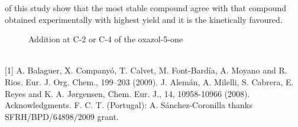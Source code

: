 of this study show that the most stable compound agree with that compound obtained
experimentally with highest yield and it is the kinetically favoured.
\\
\renewcommand{\figurename}{Scheme}
\begin{figure}[h]
 \centerline{}
 \caption[]{Addition at C-2 or C-4 of the oxazol-5-one}
\end{figure}
\renewcommand{\figurename}{Figure}
\\
{\footnotesize
[1] A. Balaguer, X. Companyó, T. Calvet, M. Font-Bardía, A. Moyano and R. Rios. Eur. J. Org.
Chem., 199–203 (2009).
\newline
[2] J. Alemán, A. Milelli, S. Cabrera, E. Reyes and K. A. Jørgensen, Chem. Eur. J., 14, 10958-10966
(2008).
\newline
Acknowledgments. F. C. T. (Portugal): A. Sánchez-Coronilla thanks SFRH/BPD/64898/2009 grant.
}


\newpage
\setcounter{figure}{0}
